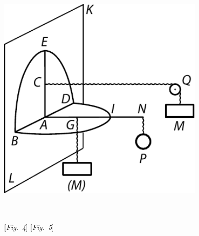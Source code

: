 \begin{minipage}[t]{0.5\textwidth}
\includegraphics[width=0.74\textwidth]{gesamttex/edit_VIII,3/images/LH_37_03_069-070_d05.pdf}
\end{minipage}
\\
\\
\hspace*{25mm} [\textit{Fig.~4}]\label{LH_37_03_069v_Fig.4}\hspace*{59mm} [\textit{Fig.~5}] \label{LH_37_03_069v_Fig.5}
\pend
\newpage
%
\count{}
\count{}
\count{}
\pstart%
